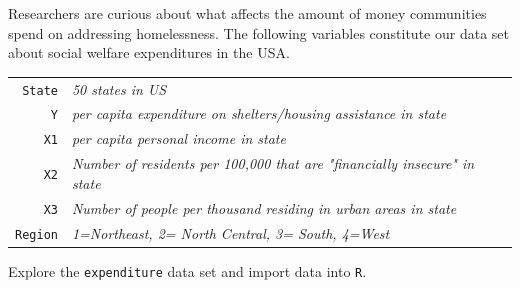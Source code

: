 \documentclass[12pt,letterpaper]{article}
\begin{document}
\noindent Researchers are curious about what affects the amount of money communities spend on addressing homelessness. The following variables constitute our data set about social welfare expenditures in the USA. \\
\vspace{.5cm}


\begin{tabular}{r|l}
	\texttt{State} &\emph{50 states in US} \\
	\texttt{Y} & \emph{per capita expenditure on shelters/housing assistance in state}\\
	\texttt{X1} &\emph{per capita personal income in state} \\
	\texttt{X2} &  \emph{Number of residents per 100,000 that are "financially insecure" in state}\\
	\texttt{X3} &  \emph{Number of people per thousand residing in urban areas in state} \\
	\texttt{Region} &  \emph{1=Northeast, 2= North Central, 3= South, 4=West} \\
\end{tabular}

\vspace{.5cm}
\noindent Explore the \texttt{expenditure} data set and import data into \texttt{R}.
\vspace{.5cm}
\end{document}
